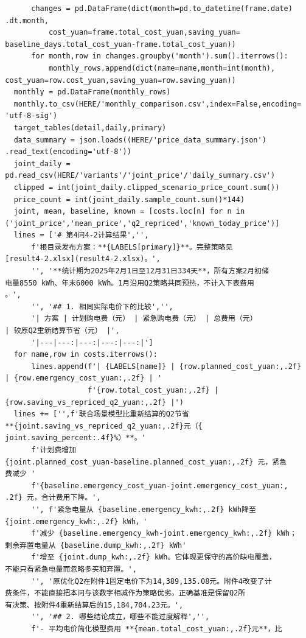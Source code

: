 \begin{verbatim}
        changes = pd.DataFrame(dict(month=pd.to_datetime(frame.date)
  .dt.month,
            cost_yuan=frame.total_cost_yuan,saving_yuan=
  baseline_days.total_cost_yuan-frame.total_cost_yuan))
        for month,row in changes.groupby('month').sum().iterrows():
            monthly_rows.append(dict(name=name,month=int(month),
  cost_yuan=row.cost_yuan,saving_yuan=row.saving_yuan))
    monthly = pd.DataFrame(monthly_rows)
    monthly.to_csv(HERE/'monthly_comparison.csv',index=False,encoding=
  'utf-8-sig')
    target_tables(detail,daily,primary)
    data_summary = json.loads((HERE/'price_data_summary.json')
  .read_text(encoding='utf-8'))
    joint_daily =
  pd.read_csv(HERE/'variants'/'joint_price'/'daily_summary.csv')
    clipped = int(joint_daily.clipped_scenario_price_count.sum())
    price_count = int(joint_daily.sample_count.sum()*144)
    joint, mean, baseline, known = [costs.loc[n] for n in
  ('joint_price','mean_price','q2_repriced','known_today_price')]
    lines = ['# 第4问4-2计算结果','',
        f'根目录发布方案：**{LABELS[primary]}**。完整策略见
  [result4-2.xlsx](result4-2.xlsx)。',
        '', '**统计期为2025年2月1日至12月31日334天**，所有方案2月初储
  电量8550 kWh、年末6000 kWh。1月沿用Q2策略共同预热，不计入下表费用
  。',
        '', '## 1. 相同实际电价下的比较','',
        '| 方案 | 计划购电费（元） | 紧急购电费（元） | 总费用（元）
  | 较原Q2重新结算节省（元） |',
        '|---|---:|---:|---:|---:|']
    for name,row in costs.iterrows():
        lines.append(f'| {LABELS[name]} | {row.planned_cost_yuan:,.2f}
  | {row.emergency_cost_yuan:,.2f} | '
                     f'{row.total_cost_yuan:,.2f} |
  {row.saving_vs_repriced_q2_yuan:,.2f} |')
    lines += ['',f'联合场景模型比重新结算的Q2节省
  **{joint.saving_vs_repriced_q2_yuan:,.2f}元（{
  joint.saving_percent:.4f}%）**。'
        f'计划费增加
  {joint.planned_cost_yuan-baseline.planned_cost_yuan:,.2f} 元，紧急
  费减少 '
        f'{baseline.emergency_cost_yuan-joint.emergency_cost_yuan:,
  .2f} 元，合计费用下降。',
        '', f'紧急电量从 {baseline.emergency_kwh:,.2f} kWh降至
  {joint.emergency_kwh:,.2f} kWh，'
        f'减少 {baseline.emergency_kwh-joint.emergency_kwh:,.2f} kWh；
  剩余弃置电量从 {baseline.dump_kwh:,.2f} kWh'
        f'增至 {joint.dump_kwh:,.2f} kWh。它体现更保守的高价缺电覆盖，
  不能只看紧急电量而忽略多买和弃置。',
        '', '原优化Q2在附件1固定电价下为14,389,135.08元。附件4改变了计
  费条件，不能直接把本问与该数字相减作为策略优劣。正确基准是保留Q2所
  有决策、按附件4重新结算后的15,184,704.23元。',
        '', '## 2. 哪些结论成立，哪些不能过度解释','',
        f'- 平均电价简化模型费用 **{mean.total_cost_yuan:,.2f}元**，比

\end{verbatim}
